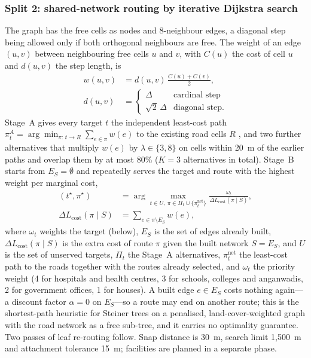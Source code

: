 \documentclass[preprint,12pt]{elsarticle}
\newcommand{\Lcost}{L_{\mathrm{cost}}}
\begin{document}
\subsubsection{Split 2: shared-network routing by iterative Dijkstra search}\label{sec:routing}
The graph has the free cells as nodes and 8-neighbour edges, a diagonal step being allowed only if both orthogonal neighbours are free. The weight of an edge $(u,v)$ between neighbouring free cells $u$ and $v$, with $C(u)$ the cost of cell $u$ and $d(u,v)$ the step length, is
\begin{equation}
\begin{aligned}
w(u,v)&=d(u,v)\,\frac{C(u)+C(v)}{2},\\
d(u,v)&=\begin{cases}\Delta&\text{cardinal step}\\ \sqrt2\,\Delta&\text{diagonal step.}\end{cases}
\end{aligned}
\label{eq:edge}
\end{equation}
Stage~A gives every target $t$ the independent least-cost path $\pi_t^{A}=\arg\min_{\pi:\,t\to R}\sum_{e\in\pi}w(e)$ to the existing road cells $R$ \cite{dijkstra1959note,hart1968astar,collischonn2000lcp}, and two further alternatives that multiply $w(e)$ by $\lambda\in\{3,8\}$ on cells within 20~m of the earlier paths and overlap them by at most 80\% ($K=3$ alternatives in total). Stage~B starts from $E_S=\emptyset$ and repeatedly serves the target and route with the highest weight per marginal cost,
\begin{equation}
\begin{aligned}
(t^\star,\pi^\star)&=\arg\max_{t\in U,\ \pi\in\Pi_t\cup\{\pi_t^{\mathrm{net}}\}}\frac{\omega_t}{\Delta\Lcost(\pi\mid S)},\\
\Delta\Lcost(\pi\mid S)&=\sum_{e\in\pi\setminus E_S}w(e),
\end{aligned}
\label{eq:stageb}
\end{equation}
where $\omega_t$ weights the target (below), $E_S$ is the set of edges already built, $\Delta\Lcost(\pi\mid S)$ is the extra cost of route $\pi$ given the built network $S=E_S$, and $U$ is the set of unserved targets, $\Pi_t$ the Stage~A alternatives, $\pi_t^{\mathrm{net}}$ the least-cost path to the roads together with the routes already selected, and $\omega_t$ the priority weight (4 for hospitals and health centres, 3 for schools, colleges and anganwadis, 2 for government offices, 1 for houses). A built edge $e\in E_S$ costs nothing again---a discount factor $\alpha=0$ on $E_S$---so a route may end on another route; this is the shortest-path heuristic for Steiner trees \cite{kou1981steiner,mehlhorn1988steiner} on a penalised, land-cover-weighted graph with the road network as a free sub-tree, and it carries no optimality guarantee. Two passes of leaf re-routing follow. Snap distance is 30~m, search limit 1{,}500~m and attachment tolerance 15~m; facilities are planned in a separate phase.
\end{document}
